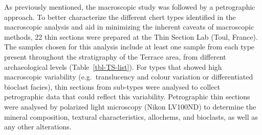 \documentclass[
  a4paper,
  DIV=11,
  numbers=noendperiod]{scrreprt}
\begin{document}
As previously mentioned, the macroscopic study was followed by a
petrographic approach. To better characterize the different chert types
identified in the macroscopic analysis and aid in minimizing the
inherent caveats of macroscopic methods, 22 thin sections were prepared
at the Thin Section Lab (Toul, France). The samples chosen for this
analysis include at least one sample from each type present throughout
the stratigraphy of the Terrace area, from different archaeological
levels (Table~\ref{tbl-TS-list}). For types that showed high macroscopic
variability (e.g.~translucency and colour variation or differentiated
bioclast facies), thin sections from sub-types were analysed to collect
petrographic data that could reflect this variability. Petrographic thin
sections were analysed by polarized light microscopy (Nikon LV100ND) to
determine the mineral composition, textural characteristics, allochems,
and bioclasts, as well as any other alterations.
\end{document}
